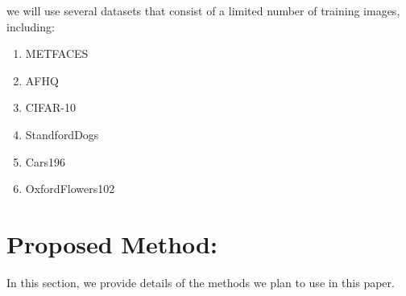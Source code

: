 \documentclass{report}
\begin{document}
we will use several datasets that consist of a limited number of training images, including: 
\begin{enumerate}
\item METFACES\cite{karras2020training} 
\item AFHQ\cite{choi2020stargan}
\item CIFAR-10\cite{krizhevsky2009learning}
\item StandfordDogs\cite{}
\item Cars196\cite{}
\item OxfordFlowers102\cite{}
\end{enumerate}


\section{Proposed Method:}


In this section, we provide details of the methods we plan to use in this paper.
\end{document}

